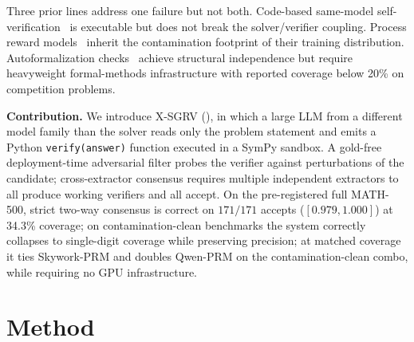 \documentclass{article}
\begin{document}
Three prior lines address one failure but not both. Code-based same-model self-verification~\citep{mathcoder2024,mathshepherd2024} is executable but does not break the solver/verifier coupling. Process reward models~\citep{lightman2024prm,qwenprm2025,skyworkprm2024} inherit the contamination footprint of their training distribution. Autoformalization checks~\citep{dtv2024} achieve structural independence but require heavyweight formal-methods infrastructure with reported coverage below 20\% on competition problems.

\textbf{Contribution.} We introduce X-SGRV (), in which a large LLM from a different model family than the solver reads only the problem statement and emits a Python \texttt{verify(answer)} function executed in a SymPy sandbox. A gold-free deployment-time adversarial filter probes the verifier against perturbations of the candidate; cross-extractor consensus requires multiple independent extractors to all produce working verifiers and all accept. On the pre-registered full MATH-500, strict two-way consensus is correct on $171/171$ accepts ($[0.979,1.000]$) at 34.3\% coverage; on contamination-clean benchmarks the system correctly collapses to single-digit coverage while preserving precision; at matched coverage it ties Skywork-PRM and doubles Qwen-PRM on the contamination-clean combo, while requiring no GPU infrastructure.

\section{Method}
\label{sec:method}
\end{document}
